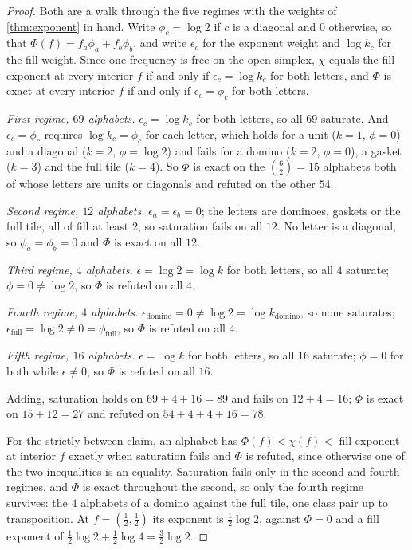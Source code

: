 \documentclass[11pt]{amsart}
\theoremstyle{definition}
\theoremstyle{remark}
\begin{document}
\begin{proof}
Both are a walk through the five regimes with the weights of \cref{thm:exponent} in hand. Write $\phi_c = \log 2$ if $c$ is a diagonal and $0$ otherwise, so that $\Phi(f) = f_a \phi_a + f_b \phi_b$, and write $\epsilon_c$ for the exponent weight and $\log k_c$ for the fill weight. Since one frequency is free on the open simplex, $\chi$ equals the fill exponent at every interior $f$ if and only if $\epsilon_c = \log k_c$ for both letters, and $\Phi$ is exact at every interior $f$ if and only if $\epsilon_c = \phi_c$ for both letters.

\emph{First regime, $69$ alphabets.} $\epsilon_c = \log k_c$ for both letters, so all $69$ saturate. And $\epsilon_c = \phi_c$ requires $\log k_c = \phi_c$ for each letter, which holds for a unit ($k = 1$, $\phi = 0$) and a diagonal ($k = 2$, $\phi = \log 2$) and fails for a domino ($k = 2$, $\phi = 0$), a gasket ($k = 3$) and the full tile ($k = 4$). So $\Phi$ is exact on the $\binom{6}{2} = 15$ alphabets both of whose letters are units or diagonals and refuted on the other $54$.

\emph{Second regime, $12$ alphabets.} $\epsilon_a = \epsilon_b = 0$; the letters are dominoes, gaskets or the full tile, all of fill at least $2$, so saturation fails on all $12$. No letter is a diagonal, so $\phi_a = \phi_b = 0$ and $\Phi$ is exact on all $12$.

\emph{Third regime, $4$ alphabets.} $\epsilon = \log 2 = \log k$ for both letters, so all $4$ saturate; $\phi = 0 \ne \log 2$, so $\Phi$ is refuted on all $4$.

\emph{Fourth regime, $4$ alphabets.} $\epsilon_{\text{domino}} = 0 \ne \log 2 = \log k_{\text{domino}}$, so none saturates; $\epsilon_{\text{full}} = \log 2 \ne 0 = \phi_{\text{full}}$, so $\Phi$ is refuted on all $4$.

\emph{Fifth regime, $16$ alphabets.} $\epsilon = \log k$ for both letters, so all $16$ saturate; $\phi = 0$ for both while $\epsilon \ne 0$, so $\Phi$ is refuted on all $16$.

Adding, saturation holds on $69 + 4 + 16 = 89$ and fails on $12 + 4 = 16$; $\Phi$ is exact on $15 + 12 = 27$ and refuted on $54 + 4 + 4 + 16 = 78$.

For the strictly-between claim, an alphabet has $\Phi(f) < \chi(f) < $ fill exponent at interior $f$ exactly when saturation fails and $\Phi$ is refuted, since otherwise one of the two inequalities is an equality. Saturation fails only in the second and fourth regimes, and $\Phi$ is exact throughout the second, so only the fourth regime survives: the $4$ alphabets of a domino against the full tile, one class pair up to transposition. At $f = (\tfrac12,\tfrac12)$ its exponent is $\tfrac12 \log 2$, against $\Phi = 0$ and a fill exponent of $\tfrac12\log 2 + \tfrac12 \log 4 = \tfrac32 \log 2$.


\end{proof}
\end{document}
